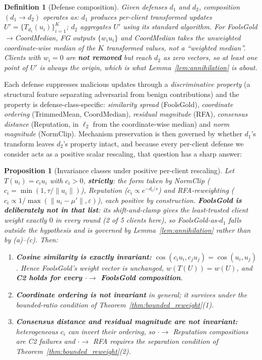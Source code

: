 \documentclass{article}
\newtheorem{proposition}{Proposition}
\newtheorem{definition}{Definition}
\begin{document}
\begin{definition}[Defense composition]
\label{def:composition}
Given defenses $d_1$ and $d_2$, composition $(d_1 \to d_2)$ operates as: $d_1$ produces per-client transformed updates $U' = \{T_{d_1}(u_i)\}_{i=1}^K$; $d_2$ aggregates $U'$ using its standard algorithm. For FoolsGold$\to$CoordMedian, FG outputs $\{w_i u_i\}$ and CoordMedian takes the \emph{unweighted} coordinate-wise median of the $K$ transformed values, not a ``weighted median''. Clients with $w_i = 0$ are \textbf{not removed} but reach $d_2$ as zero vectors, so at least one point of $U'$ is always the origin, which is what Lemma~\ref{lem:annihilation} is about.
\end{definition}

Each defense suppresses malicious updates through a \emph{discriminative property} (a structural feature separating adversarial from benign contributions) and the property is defense-class-specific: \emph{similarity spread} (FoolsGold), \emph{coordinate ordering} (TrimmedMean, CoordMedian), \emph{residual magnitude} (RFA), \emph{consensus distance} (Reputation, in $\ell_2$ from the coordinate-wise median) and \emph{norm magnitude} (NormClip). Mechanism preservation is then governed by whether $d_1$'s transform leaves $d_2$'s property intact, and because every per-client defense we consider acts as a positive scalar rescaling, that question has a sharp answer:

\begin{proposition}[Invariance classes under positive per-client rescaling]
\label{prop:invariance}
Let $T(u_i) = c_i u_i$ with $c_i > 0$, \textbf{strictly}: the form taken by NormClip ($c_i = \min(1, \tau/\|u_i\|)$), Reputation ($c_i \propto e^{-d_i/s}$) and RFA-reweighting ($c_i \propto 1/\max(\|u_i - \mu'\|, \varepsilon)$), each positive by construction. \textbf{FoolsGold is deliberately not in that list}: its shift-and-clamp gives the least-trusted client weight exactly $0$ in \emph{every} round (2 of 5 clients here), so FoolsGold-as-$d_1$ falls outside the hypothesis and is governed by Lemma~\ref{lem:annihilation} rather than by (a)--(c). Then:
\begin{enumerate}[noitemsep,topsep=2pt,label=(\alph*)]
\item \textbf{Cosine similarity is exactly invariant:} $\cos(c_i u_i, c_j u_j) = \cos(u_i, u_j)$. Hence FoolsGold's weight vector is unchanged, $w(T(U)) = w(U)$, and \textbf{C2 holds for every $\cdot \to$ FoolsGold composition}.
\item \textbf{Coordinate ordering is not invariant} in general; it survives under the bounded-ratio condition of Theorem~\ref{thm:bounded_reweight}(1).
\item \textbf{Consensus distance and residual magnitude are not invariant:} heterogeneous $c_i$ can invert their ordering, so $\cdot \to$ Reputation compositions are C2 failures and $\cdot \to$ RFA requires the separation condition of Theorem~\ref{thm:bounded_reweight}(2).
\end{enumerate}
\end{proposition}
\end{document}
